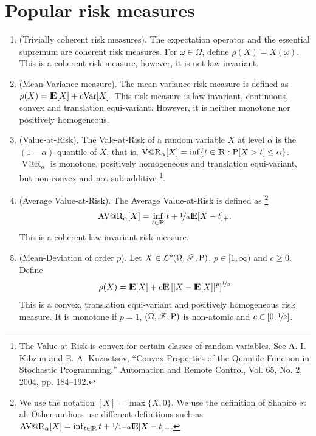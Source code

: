 \documentclass[a4paper,10pt]{scrbook}
\begin{document}
\section{Popular risk measures}
\begin{enumerate}
 \item (Trivially coherent risk measures). The expectation operator and the essential supremum are 
       coherent risk measures. For $\omega\in\Omega$, define $\rho(X) = X(\omega)$. This is a coherent
       risk measure, however, it is not law invariant.
       
 \item (Mean-Variance measure).  The mean-variance risk measure is defined as $\rho(X) = \E[X] + c \mathrm{Var}[X]$.
       This risk measure is law invariant, continuous, convex and translation equi-variant. 
       However, it is neither monotone nor positively homogeneous.
       
 \item (Value-at-Risk). The Vale-at-Risk of a random variable $X$ at level $\alpha$ is the $(1-\alpha)$-quantile of $X$,
       that is, $\operatorname{V@R}_\alpha[X] = \inf\{t\in\Re: \prob[X>t]\leq \alpha\}$. $\operatorname{V@R}_\alpha$ 
       is monotone, positively homogeneous and translation equi-variant, but non-convex and not sub-additive%
	  \footnote{The Value-at-Risk is convex for certain classes of random variables. 
	            See A. I. Kibzun and E. A. Kuznetsov, ``Convex Properties of the Quantile Function 
	            in Stochastic Programming,'' Automation and Remote Control, Vol. 65, No. 2, 2004, 
	            pp. 184--192.}.
	  
 \item (Average Value-at-Risk). The Average Value-at-Risk is defined as%
	  \footnote{We use the notation $[X]=\max\{X,0\}$. We use the definition of Shapiro et al. Other authors
	            use different definitions such as $\operatorname{AV@R}_\alpha[X] = \inf_{t\in\Re}t + \nicefrac{1}{1-\alpha}\E[X-t]_+$.}
       \[
          \operatorname{AV@R}_\alpha[X] = \inf_{t\in\Re}t + \nicefrac{1}{\alpha}\E[X-t]_+.
       \]
       This is a coherent law-invariant risk measure.
       
 \item (Mean-Deviation of order $p$). Let $X\in\mathcal{L}^p(\Omega,\mathscr{F},\mathrm{P})$, $p\in[1,\infty)$ and $c\geq 0$.
       Define
       \[
        \rho(X) = \E[X] + c \E\left[ |X-\E[X]|^p\right]^{\nicefrac{1}{p}}
       \]
       This is a convex, translation equi-variant and positively homogeneous risk measure.
       It is monotone if $p=1$, $(\Omega,\mathscr{F},\mathrm{P})$ is non-atomic and $c\in[0,\nicefrac{1}{2}]$.
       

\end{enumerate}
\end{document}
